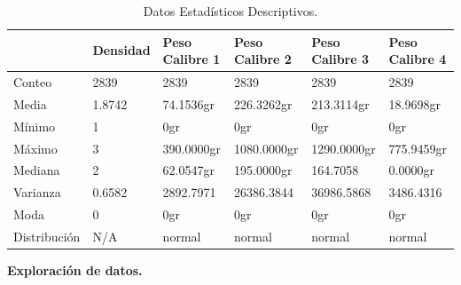 \begin{table}[htbp]
\begin{center}
\begin{tabular}{|l|l|l|l|l|l|}
\hline
& Densidad & Peso Calibre 1 & Peso Calibre 2 & Peso Calibre 3 & Peso Calibre 4  \\
\hline \hline
Conteo & 2839 & 2839 & 2839 & 2839 & 2839  \\ \hline
Media & 1.8742 & 74.1536gr & 226.3262gr & 213.3114gr & 18.9698gr  \\ \hline
Mínimo & 1 & 0gr & 0gr & 0gr & 0gr  \\ \hline
Máximo & 3 & 390.0000gr & 1080.0000gr & 1290.0000gr & 775.9459gr  \\ \hline
Mediana & 2 & 62.0547gr &195.0000gr & 164.7058 & 0.0000gr \\ \hline
Varianza & 0.6582 & 2892.7971 & 26386.3844 & 36986.5868 & 3486.4316 \\ \hline
Moda & 0 & 0gr & 0gr & 0gr & 0gr  \\ \hline
Distribución & N/A & normal & normal & normal & normal  \\ \hline
\end{tabular}
\caption{Datos Estadísticos Descriptivos.}
\label{tabla:sencilla}
\end{center}
\end{table}

\noindent
\textbf{Exploración de datos.}\\

